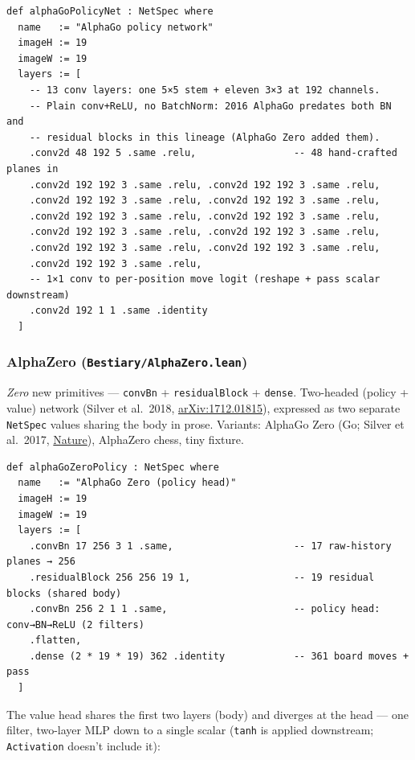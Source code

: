 \begin{verbatim}
def alphaGoPolicyNet : NetSpec where
  name   := "AlphaGo policy network"
  imageH := 19
  imageW := 19
  layers := [
    -- 13 conv layers: one 5×5 stem + eleven 3×3 at 192 channels.
    -- Plain conv+ReLU, no BatchNorm: 2016 AlphaGo predates both BN and
    -- residual blocks in this lineage (AlphaGo Zero added them).
    .conv2d 48 192 5 .same .relu,                 -- 48 hand-crafted planes in
    .conv2d 192 192 3 .same .relu, .conv2d 192 192 3 .same .relu,
    .conv2d 192 192 3 .same .relu, .conv2d 192 192 3 .same .relu,
    .conv2d 192 192 3 .same .relu, .conv2d 192 192 3 .same .relu,
    .conv2d 192 192 3 .same .relu, .conv2d 192 192 3 .same .relu,
    .conv2d 192 192 3 .same .relu, .conv2d 192 192 3 .same .relu,
    .conv2d 192 192 3 .same .relu,
    -- 1×1 conv to per-position move logit (reshape + pass scalar downstream)
    .conv2d 192 1 1 .same .identity
  ]
\end{verbatim}

\subsubsection*{AlphaZero (\texttt{Bestiary/AlphaZero.lean})}
\label{bestiary:alphagozero}
\emph{Zero} new primitives --- \texttt{convBn} + \texttt{residualBlock}
+ \texttt{dense}. Two-headed (policy + value) network
(Silver et al.\ 2018,
\href{https://arxiv.org/abs/1712.01815}{arXiv:1712.01815}),
expressed as two separate \texttt{NetSpec} values sharing the body in
prose. Variants: AlphaGo Zero (Go; Silver et al.\ 2017,
\href{https://www.nature.com/articles/nature24270}{Nature}),
AlphaZero chess, tiny fixture.

\begin{verbatim}
def alphaGoZeroPolicy : NetSpec where
  name   := "AlphaGo Zero (policy head)"
  imageH := 19
  imageW := 19
  layers := [
    .convBn 17 256 3 1 .same,                     -- 17 raw-history planes → 256
    .residualBlock 256 256 19 1,                  -- 19 residual blocks (shared body)
    .convBn 256 2 1 1 .same,                      -- policy head: conv→BN→ReLU (2 filters)
    .flatten,
    .dense (2 * 19 * 19) 362 .identity            -- 361 board moves + pass
  ]
\end{verbatim}

The value head shares the first two layers (body) and diverges at
the head — one filter, two-layer MLP down to a single scalar
(\texttt{tanh} is applied downstream; \texttt{Activation} doesn't
include it):


